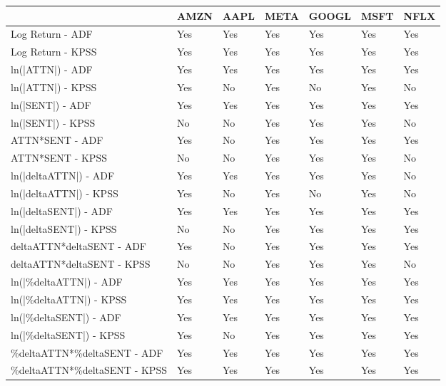 \begin{tabular}{lllllll}
\toprule
{} & AMZN & AAPL & META & GOOGL & MSFT & NFLX \\
\midrule
Log Return - ADF             &  Yes &  Yes &  Yes &   Yes &  Yes &  Yes \\
Log Return - KPSS            &  Yes &  Yes &  Yes &   Yes &  Yes &  Yes \\
ln(|ATTN|) - ADF             &  Yes &  Yes &  Yes &   Yes &  Yes &  Yes \\
ln(|ATTN|) - KPSS            &  Yes &   No &  Yes &    No &  Yes &   No \\
ln(|SENT|) - ADF             &  Yes &  Yes &  Yes &   Yes &  Yes &  Yes \\
ln(|SENT|) - KPSS            &   No &   No &  Yes &   Yes &  Yes &   No \\
ATTN*SENT - ADF              &  Yes &   No &  Yes &   Yes &  Yes &  Yes \\
ATTN*SENT - KPSS             &   No &   No &  Yes &   Yes &  Yes &   No \\
ln(|deltaATTN|) - ADF        &  Yes &  Yes &  Yes &   Yes &  Yes &   No \\
ln(|deltaATTN|) - KPSS       &  Yes &   No &  Yes &    No &  Yes &   No \\
ln(|deltaSENT|) - ADF        &  Yes &  Yes &  Yes &   Yes &  Yes &  Yes \\
ln(|deltaSENT|) - KPSS       &   No &   No &  Yes &   Yes &  Yes &  Yes \\
deltaATTN*deltaSENT - ADF    &  Yes &   No &  Yes &   Yes &  Yes &  Yes \\
deltaATTN*deltaSENT - KPSS   &   No &   No &  Yes &   Yes &  Yes &   No \\
ln(|\%deltaATTN|) - ADF       &  Yes &  Yes &  Yes &   Yes &  Yes &  Yes \\
ln(|\%deltaATTN|) - KPSS      &  Yes &  Yes &  Yes &   Yes &  Yes &  Yes \\
ln(|\%deltaSENT|) - ADF       &  Yes &  Yes &  Yes &   Yes &  Yes &  Yes \\
ln(|\%deltaSENT|) - KPSS      &  Yes &   No &  Yes &   Yes &  Yes &  Yes \\
\%deltaATTN*\%deltaSENT - ADF  &  Yes &  Yes &  Yes &   Yes &  Yes &  Yes \\
\%deltaATTN*\%deltaSENT - KPSS &  Yes &  Yes &  Yes &   Yes &  Yes &  Yes \\
\bottomrule
\end{tabular}
